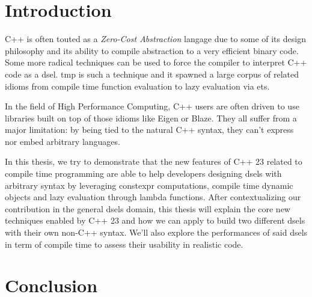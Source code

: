 \documentclass[english,12pt,a4paper]{book}
\providecommand{\cpp}{\textsc{C++}\xspace}
\begin{document}
\section{Introduction}

\cpp is often touted as a \textit{Zero-Cost Abstraction} langage due to some of
its design philosophy and its ability to compile abstraction to a very efficient
binary code. Some more radical techniques can be used to force the compiler to
interpret \cpp code as a \gls{dsel}. \Gls{tmp} is such a technique
and it spawned a large corpus of related idioms from compile time function
evaluation to lazy evaluation via \glspl{et}.

In the field of High Performance Computing, \cpp users are often driven to use
libraries built on top of those idioms like Eigen\cite{eigen} or
Blaze\cite{blazelib,iglberger2012_2}. They all suffer from a major limitation:
by being tied to the natural \cpp syntax, they can't express nor embed arbitrary
languages.

In this thesis, we try to demonstrate that the new features of \cpp23 related to
compile time programming are able to help developers designing \glspl{dsel} with
arbitrary syntax by leveraging \gls{constexpr} computations, compile time dynamic
objects and lazy evaluation through lambda functions. After contextualizing our
contribution in the general \glspl{dsel} domain, this thesis will explain the core
new techniques enabled by \cpp23 and how we can apply to build two different
\glspl{dsel} with their own non-\cpp syntax. We'll also explore the performances of
said \glspl{dsel} in term of compile time to assess their usability in realistic code.






\section{Conclusion}

\end{document}
